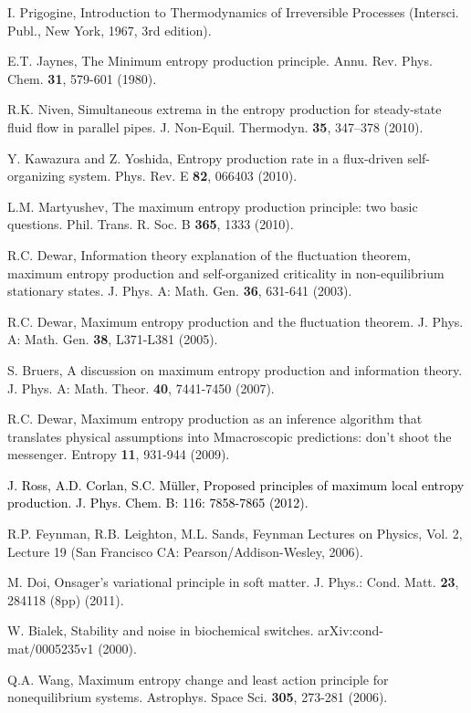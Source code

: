 \documentclass[aps,prl,reprint,singlecolumn,superscriptaddress]{revtex4}
\begin{document}
{\begin{thebibliography}{}
 I. Prigogine, {Introduction to Thermodynamics of Irreversible Processes} (Intersci. Publ., New York, 1967, 3rd edition).

 E.T. Jaynes, The Minimum entropy production principle. Annu. Rev. Phys. Chem. {\bf 31}, 579-601 (1980).

 R.K. Niven, {Simultaneous extrema in the entropy production for steady-state fluid flow in parallel pipes.} J. Non-Equil. Thermodyn. {\bf 35}, 347–378 (2010).

 Y. Kawazura and Z. Yoshida, {Entropy production rate in a flux-driven self-organizing system.} Phys. Rev. E {\bf 82}, 066403 (2010).

 L.M. Martyushev, The maximum entropy production principle: two basic questions. Phil. Trans. R. Soc. B {\bf 365}, 1333 (2010).

 R.C. Dewar, Information theory explanation of the fluctuation theorem, maximum entropy production and
self-organized criticality in non-equilibrium stationary states. J. Phys. A: Math. Gen. {\bf 36}, 631-641 (2003).

 R.C. Dewar, Maximum entropy production and the fluctuation theorem. J. Phys. A: Math. Gen. {\bf 38}, L371-L381 (2005).

 S. Bruers, A discussion on maximum entropy production and information theory. J. Phys. A: Math. Theor. {\bf 40}, 7441-7450 (2007).

 R.C. Dewar, Maximum entropy production as an inference algorithm that translates physical assumptions into Mmacroscopic predictions: don’t shoot the messenger. Entropy {\bf 11}, 931-944 (2009).

 \textcolor{black}{J. Ross, A.D. Corlan, S.C. M\"uller, Proposed principles of maximum local entropy production. J. Phys. Chem. B: 116: 7858-7865 (2012).}

 R.P. Feynman, R.B. Leighton, M.L. Sands, 
         Feynman Lectures on Physics, Vol. 2, Lecture 19 (San Francisco CA: Pearson/Addison-Wesley, 2006).

 M. Doi, Onsager's variational principle in soft matter. J. Phys.: Cond. Matt. {\bf 23}, 284118 (8pp) (2011). 

 W. Bialek, Stability and noise in biochemical switches. arXiv:cond-mat/0005235v1 (2000).

 Q.A. Wang, Maximum entropy change and least action principle for nonequilibrium systems. Astrophys. Space Sci. {\bf 305}, 273-281 (2006).


\end{thebibliography}}
\end{document}
